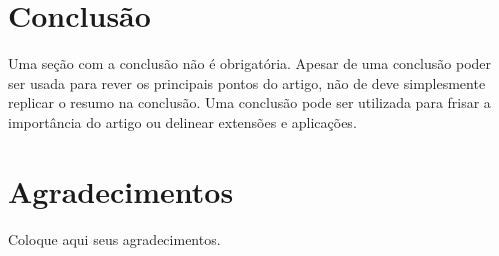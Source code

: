 \section{Conclusão}

Uma seção com a conclusão não é obrigatória. Apesar de uma conclusão poder ser usada
para rever os principais pontos do artigo, não de deve simplesmente replicar o resumo
na conclusão. Uma conclusão pode ser utilizada para frisar a importância do artigo
ou delinear extensões e aplicações. 


\section*{Agradecimentos}
Coloque aqui seus agradecimentos.
